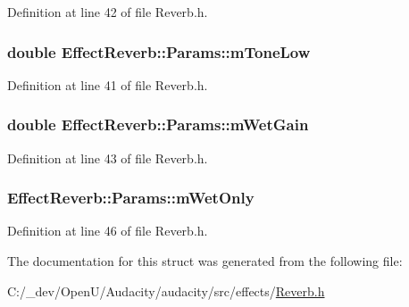 Definition at line 42 of file Reverb.\+h.

\subsubsection[{\texorpdfstring{m\+Tone\+Low}{mToneLow}}]{\setlength{\rightskip}{0pt plus 5cm}double Effect\+Reverb\+::\+Params\+::m\+Tone\+Low}\hypertarget{struct_effect_reverb_1_1_params_a519bad801220d2a5bd580cd65c2f1f49}{}\label{struct_effect_reverb_1_1_params_a519bad801220d2a5bd580cd65c2f1f49}


Definition at line 41 of file Reverb.\+h.

\subsubsection[{\texorpdfstring{m\+Wet\+Gain}{mWetGain}}]{\setlength{\rightskip}{0pt plus 5cm}double Effect\+Reverb\+::\+Params\+::m\+Wet\+Gain}\hypertarget{struct_effect_reverb_1_1_params_adfc1a7a847434c0940894db5b1806f37}{}\label{struct_effect_reverb_1_1_params_adfc1a7a847434c0940894db5b1806f37}


Definition at line 43 of file Reverb.\+h.

\subsubsection[{\texorpdfstring{m\+Wet\+Only}{mWetOnly}}]{ Effect\+Reverb\+::\+Params\+::m\+Wet\+Only}\hypertarget{struct_effect_reverb_1_1_params_afa871feeebe1ab369c9b7184357be035}{}\label{struct_effect_reverb_1_1_params_afa871feeebe1ab369c9b7184357be035}


Definition at line 46 of file Reverb.\+h.



The documentation for this struct was generated from the following file\+:\begin{DoxyCompactItemize}
\item 
C\+:/\+\_\+dev/\+Open\+U/\+Audacity/audacity/src/effects/\hyperlink{_reverb_8h}{Reverb.\+h}\end{DoxyCompactItemize}
